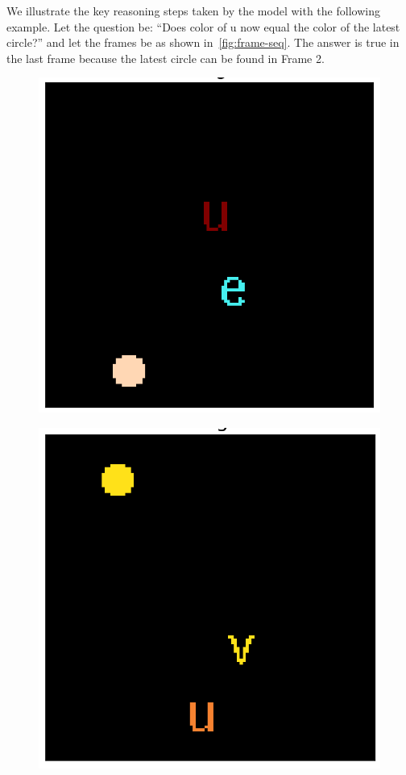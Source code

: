 We illustrate the key reasoning steps taken by the model with the following example.
Let the question be: ``Does color of u now equal the color of the latest circle?''
and let the frames be as shown in~\cref{fig:frame-seq}.
The answer is true in the last frame because the latest circle can be found in Frame 2. 
\begin{figure}[!h]
\begin{minipage}{0.25\textwidth}
\centering
\includegraphics[width=0.9\linewidth]{"../img/visualization/sample 2/Frame 1"}
\label{fig:frame-1}
\end{minipage}\hfill
\begin{minipage}{0.25\textwidth}
	\centering
	\includegraphics[width=0.9\linewidth]{"../img/visualization/sample 2/Frame 2"}

\end{minipage}
\end{figure}
